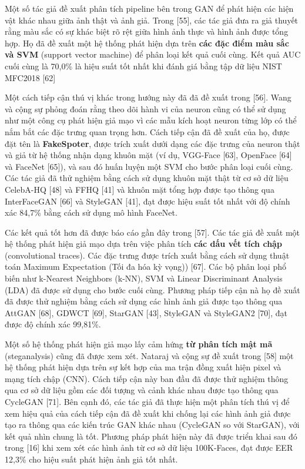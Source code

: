 \documentclass{article}
\begin{document}
Một số tác giả đề xuất phân tích pipeline bên trong GAN để phát hiện các hiện vật khác nhau giữa ảnh thật và ảnh giả. Trong [55], các tác giả đưa ra giả thuyết rằng màu sắc có sự khác biệt rõ rệt giữa hình ảnh thực và hình ảnh được tổng hợp. Họ đã đề xuất một hệ thống phát hiện dựa trên \textbf{các đặc điểm màu sắc và SVM} (support vector machine) để phân loại kết quả cuối cùng. Kết quả AUC cuối cùng là 70,0\% là hiệu suất tốt nhất khi đánh giá bằng tập dữ liệu NIST MFC2018 [62]

Một cách tiếp cận thú vị khác trong hướng này đã đã đề xuất trong [56]. Wang và cộng sự phỏng đoán rằng theo dõi hành vi của neuron cũng có thể sử dụng như một công cụ phát hiện giả mạo vì các mẫu kích hoạt neuron từng lớp có thể nắm bắt các đặc trưng quan trọng hơn. Cách tiếp cận đã đề xuất của họ, được đặt tên là \textbf{FakeSpoter}, được trích xuất dưới dạng các đặc trưng của neuron thật và giả từ hệ thống nhận dạng khuôn mặt (ví dụ, VGG-Face [63], OpenFace [64] và FaceNet [65]), và sau đó huấn luyện một SVM cho bước phân loại cuối cùng. Các tác giả đã thử nghiệm bằng cách sử dụng khuôn mặt thật từ cơ sở dữ liệu CelebA-HQ [48] và FFHQ [41] và khuôn mặt tổng hợp được tạo thông qua InterFaceGAN [66] và StyleGAN [41], đạt được hiệu suất tốt nhất với độ chính xác 84,7\% bằng cách sử dụng mô hình FaceNet.

Các kết quả tốt hơn đã được báo cáo gần đây trong [57]. Các tác giả đề xuất một hệ thống phát hiện giả mạo dựa trên việc phân tích \textbf{các dấu vết tích chập} (convolutional traces). Các đặc trưng được trích xuất bằng cách sử dụng thuật toán Maximum Expectation (Tối đa hóa kỳ vọng)) [67]. Các bộ phân loại phổ biến như k-Nearest Neighbors (k-NN), SVM và Linear Discriminant Analysis (LDA) đã được sử dụng cho bước cuối cùng. Phương pháp tiếp cận nà họ đề xuất đã được thử nghiệm bằng cách sử dụng các hình ảnh giả được tạo thông qua AttGAN [68], GDWCT [69], StarGAN [43], StyleGAN và StyleGAN2 [70], đạt được độ chính xác 99,81\%.

Một số hệ thống phát hiện giả mạo lấy cảm hứng \textbf{từ phân tích mật mã} (steganalysis) cũng đã được xem xét. Nataraj và cộng sự đề xuất trong [58] một hệ thống phát hiện dựa trên sự kết hợp của ma trận đồng xuất hiện pixel và mạng tích chập (CNN). Cách tiếp cận này ban đầu đã được thử nghiệm thông qua cơ sở dữ liệu gồm các đối tượng và cảnh khác nhau được tạo thông qua CycleGAN [71]. Bên cạnh đó, các tác giả đã thực hiện một phân tích thú vị để xem hiệu quả của cách tiếp cận đã đề xuất khi chống lại các hình ảnh giả được tạo ra thông qua các kiến trúc GAN khác nhau (CycleGAN so với StarGAN), với kết quả nhìn chung là tốt. Phương pháp phát hiện này đã được triển khai sau đó trong [16] khi xem xét các hình ảnh từ cơ sở dữ liệu 100K-Faces, đạt được EER 12,3\% cho hiệu suất phát hiện ảnh giả tốt nhất.
\end{document}
